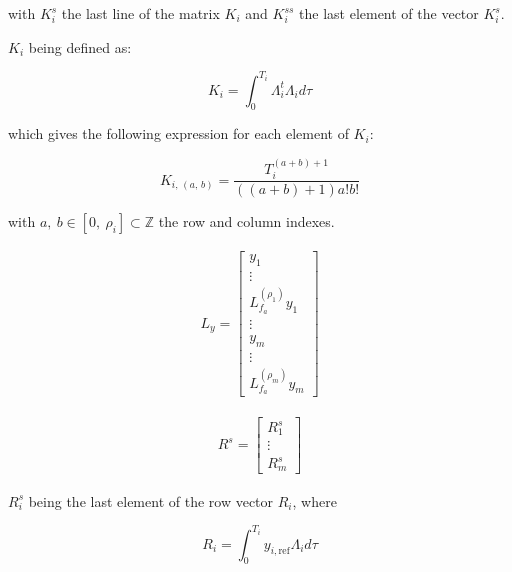 \documentclass[letterpaper, 10 pt, conference]{ieeeconf}  %
\begin{document}
with $K^{s}_i$ the last line of the matrix $K_i$ and $K^{ss}_i$ the last element of the vector $K^{s}_i$. 

$K_i$ being defined as:


\begin{equation*}
K_i = \int^{T_i}_0\Lambda_i^t\Lambda_id\tau  
\end{equation*}

which gives the following expression for each element of $K_i$:

\begin{equation*}
K_{i,\,(a,\,b)} = \frac{T_i^{(a+b)+1}}{((a+b)+1)a!b!}
\end{equation*}

with ${a,\ b \in [0,\ \rho_i] \subset \mathds{Z}}$ the row and column indexes.

\begin{eqnarray}
L_y = 
\left[\begin{array}{c}
y_1\\
\vdots\\
L_{f_a}^{(\rho_1)}y_1\\
\vdots\\
y_m\\
\vdots\\
L_{f_a}^{(\rho_m)}y_m
\end{array}\right]
\end{eqnarray}

\begin{eqnarray}
R^s = 
\left[\begin{array}{c}
R_1^s\\
\vdots\\
R_m^s
\end{array}\right]
\end{eqnarray}

${R^s_i}$ being the last element of the row vector $R_i$, where

\begin{equation}
R_i = \int^{T_i}_0y_{i,\text{ref}}\Lambda_id\tau
\label{eq:obstofref}
\end{equation}


\end{document}
